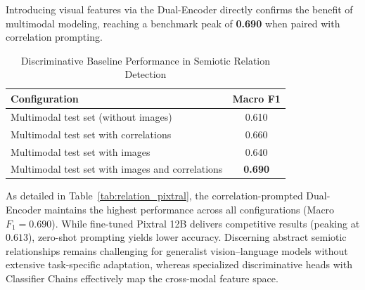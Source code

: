 Introducing visual features via the Dual-Encoder directly confirms the benefit of multimodal modeling, reaching a benchmark peak of \textbf{0.690} when paired with correlation prompting.

\begin{table}[!t]
\centering
\caption{Discriminative Baseline Performance in Semiotic Relation Detection}
\label{tab:relation_baselines}
\small
\renewcommand{\arraystretch}{1.05}
\begin{tabular}{l c}
\hline
\textbf{Configuration} & \textbf{Macro F1} \\
\hline
Multimodal test set (without images) & 0.610 \\
Multimodal test set with correlations & 0.660 \\
Multimodal test set with images & 0.640 \\
Multimodal test set with images and correlations & \textbf{0.690} \\
\hline
\end{tabular}
\end{table}

As detailed in Table~\ref{tab:relation_pixtral}, the correlation-prompted Dual-Encoder maintains the highest performance across all configurations (Macro $F_1 = 0.690$). While fine-tuned Pixtral 12B delivers competitive results (peaking at $0.613$), zero-shot prompting yields lower accuracy. Discerning abstract semiotic relationships remains challenging for generalist vision--language models without extensive task-specific adaptation, whereas specialized discriminative heads with Classifier Chains effectively map the cross-modal feature space.

